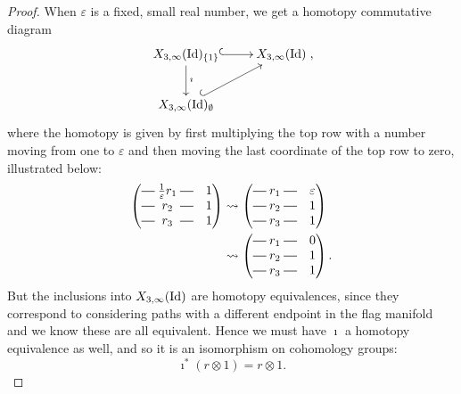 \begin{proof}
  When $\varepsilon$ is a fixed, small real number, we get a homotopy
  commutative diagram
  \[ \xymatrix{ X_{3,\infty}(\Id)_{\set{1}} \ar[d]^{\imath}
    \ar@{^(->}[r] & X_{3,\infty}(\Id) \\
    X_{3,\infty}(\Id)_{\emptyset} \ar@{^(->}[ur] }, \]
  where the homotopy is given by first multiplying the top row with a
  number moving from one to $\varepsilon$ and then moving the last
  coordinate of the top row to zero, illustrated below:
  \begin{align*}
    \begin{pmatrix}
      \matrow{\frac{1}{\varepsilon}r_1} & 1 \\
      \matrow{r_2} & 1 \\
      \matrow{r_3} & 1
    \end{pmatrix} 
                   &\leadsto 
                     \begin{pmatrix}
                       \matrow{r_1} & \varepsilon \\
                       \matrow{r_2} & 1 \\
                       \matrow{r_3} & 1
                     \end{pmatrix} \\
                                        &\leadsto
                                          \begin{pmatrix}
                                            \matrow{r_1} & 0 \\
                                            \matrow{r_2} & 1 \\
                                            \matrow{r_3} & 1
                                          \end{pmatrix}.
  \end{align*}
  But the inclusions into $X_{3,\infty}(\operatorname{Id})$ are homotopy
  equivalences, since they correspond to considering paths with a
  different endpoint in the flag manifold and we know these are all
  equivalent. Hence we must have $\imath$ a homotopy equivalence as
  well, and so it is an isomorphism on cohomology groups:
  \[ \imath^*(r\otimes 1) = r\otimes 1. \]
  

\end{proof}

